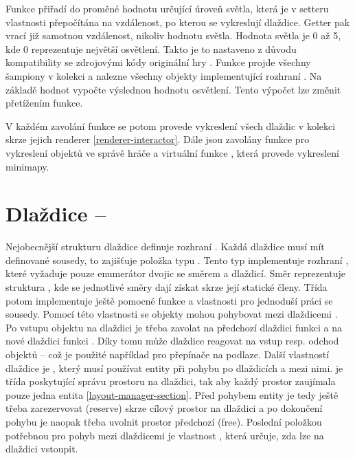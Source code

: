 Funkce  přiřadí do proměné  hodnotu určující úroveň světla, která je v setteru
vlastnosti přepočítána na vzdálenost, po kterou se vykreslují dlaždice. Getter pak vrací již samotnou vzdálenost,
nikoliv hodnotu světla. Hodnota světla je 0 až 5, kde 0 reprezentuje největší osvětlení. Takto je to nastaveno
z důvodu kompatibility se zdrojovými kódy originální hry \cite{DMDecompilation}. 
 Funkce projde všechny šampiony v kolekci  a nalezne všechny 
objekty implementující rozhraní . Na základě hodnot  vypočte 
výslednou hodnotu osvětlení. Tento výpočet lze změnit přetížením funkce. 

V každém zavolání funkce  se potom provede vykreslení všech dlaždic v kolekci 
skrze jejich renderer \vref{renderer-interactor}. Dále jsou zavolány funkce  pro vykreslení objektů
ve správě hráče a virtuální funkce , která provede vykreslení minimapy.


\section{Dlaždice -- }
Nejobecnější strukturu dlaždice definuje rozhraní . Každá dlaždice musí mít definované sousedy,
to zajišťuje položka  typu . Tento typ implementuje rozhraní ,
které vyžaduje pouze enumerátor dvojic se směrem a dlaždicí. Směr reprezentuje struktura , kde
se jednotlivé směry dají získat skrze její statické členy. Třída  potom implementuje ještě
pomocné funkce a vlastnosti pro jednoduší práci se sousedy. Pomocí této vlastnosti se objekty mohou pohybovat
mezi dlaždicemi . Po vstupu objektu na dlaždici je třeba zavolat na předchozí dlaždici funkci  a
na nové dlaždici funkci . Díky tomu může dlaždice reagovat na vstup resp. odchod objektů --
což je použité například pro přepínače na podlaze. Další vlastností dlaždice je , který 
musí používat entity při pohybu po dlaždicích a mezi nimi.  je třída poskytující správu prostoru
na dlaždici, tak aby každý prostor zaujímala pouze jedna entita \vref{layout-manager-section}. Před pohybem entity je
tedy ještě třeba zarezervovat (reserve) skrze  cílový prostor na dlaždici a po dokončení pohybu
je naopak třeba uvolnit prostor předchozí (free). Poslední položkou potřebnou pro pohyb mezi dlaždicemi je vlastnost
, která určuje, zda lze na dlaždici vstoupit.

